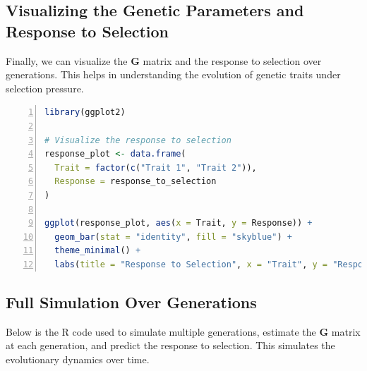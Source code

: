 \documentclass[12pt,a4paper]{article}
\begin{document}
\subsection*{Visualizing the Genetic Parameters and Response to Selection}

Finally, we can visualize the \( \mathbf{G} \) matrix and the response to selection over generations. This helps in understanding the evolution of genetic traits under selection pressure.

\begin{lstlisting}[language=R, 
                   caption=Visualizing the Response to Selection,
                   basicstyle=\ttfamily\footnotesize,
                   keywordstyle=\color{blue},
                   stringstyle=\color{red},
                   commentstyle=\color{green!60!black},
                   numbers=left,
                   numberstyle=\tiny\color{gray},
                   frame=single,
                   breaklines=true,
                   linewidth=0.95\textwidth,
                   columns=flexible,
                   xleftmargin=0.05\textwidth,
                   xrightmargin=0.05\textwidth]
library(ggplot2)

# Visualize the response to selection
response_plot <- data.frame(
  Trait = factor(c("Trait 1", "Trait 2")),
  Response = response_to_selection
)

ggplot(response_plot, aes(x = Trait, y = Response)) +
  geom_bar(stat = "identity", fill = "skyblue") +
  theme_minimal() +
  labs(title = "Response to Selection", x = "Trait", y = "Response")
\end{lstlisting}

\subsection*{Full Simulation Over Generations}

Below is the R code used to simulate multiple generations, estimate the \( \mathbf{G} \) matrix at each generation, and predict the response to selection. This simulates the evolutionary dynamics over time.
\end{document}
